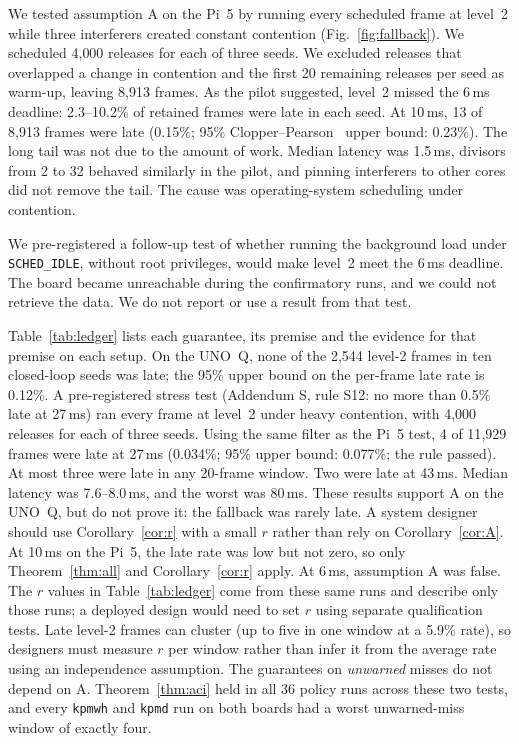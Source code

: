 \documentclass[acmsmall,screen]{acmart}
\newcommand{\pol}[1]{\texttt{#1}}
\begin{document}
We tested assumption A on the Pi~5 by running every scheduled frame at level~2 while three interferers created constant contention (Fig.~\ref{fig:fallback}). We scheduled 4{,}000 releases for each of three seeds. We excluded releases that overlapped a change in contention and the first 20 remaining releases per seed as warm-up, leaving 8{,}913 frames. As the pilot suggested, level~2 missed the 6\,ms deadline: 2.3--10.2\% of retained frames were late in each seed. At 10\,ms, 13 of 8{,}913 frames were late (0.15\%; 95\% Clopper--Pearson~\cite{clopper1934} upper bound: 0.23\%). The long tail was not due to the amount of work. Median latency was 1.5\,ms, divisors from 2 to 32 behaved similarly in the pilot, and pinning interferers to other cores did not remove the tail. The cause was operating-system scheduling under contention.

We pre-registered a follow-up test of whether running the background load under \texttt{SCHED\_IDLE}, without root privileges, would make level~2 meet the 6\,ms deadline. The board became unreachable during the confirmatory runs, and we could not retrieve the data. We do not report or use a result from that test.

Table~\ref{tab:ledger} lists each guarantee, its premise and the evidence for that premise on each setup. On the UNO~Q, none of the 2{,}544 level-2 frames in ten closed-loop seeds was late; the 95\% upper bound on the per-frame late rate is 0.12\%. A pre-registered stress test (Addendum S, rule S12: no more than 0.5\% late at 27\,ms) ran every frame at level~2 under heavy contention, with 4{,}000 releases for each of three seeds. Using the same filter as the Pi~5 test, 4 of 11{,}929 frames were late at 27\,ms (0.034\%; 95\% upper bound: 0.077\%; the rule passed). At most three were late in any 20-frame window. Two were late at 43\,ms. Median latency was 7.6--8.0\,ms, and the worst was 80\,ms. These results support A on the UNO~Q, but do not prove it: the fallback was rarely late. A system designer should use Corollary~\ref{cor:r} with a small $r$ rather than rely on Corollary~\ref{cor:A}. At 10\,ms on the Pi~5, the late rate was low but not zero, so only Theorem~\ref{thm:all} and Corollary~\ref{cor:r} apply. At 6\,ms, assumption A was false. The $r$ values in Table~\ref{tab:ledger} come from these same runs and describe only those runs; a deployed design would need to set $r$ using separate qualification tests. Late level-2 frames can cluster (up to five in one window at a 5.9\% rate), so designers must measure $r$ per window rather than infer it from the average rate using an independence assumption. The guarantees on \emph{unwarned} misses do not depend on A. Theorem~\ref{thm:aci} held in all 36 policy runs across these two tests, and every \pol{kpmwh} and \pol{kpmd} run on both boards had a worst unwarned-miss window of exactly four.
\end{document}
